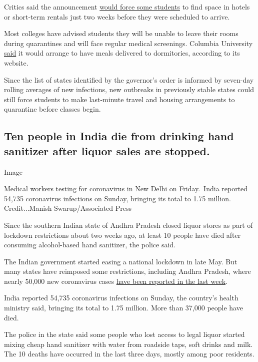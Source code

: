 Critics said the announcement
\href{https://cornellsun.com/2020/07/31/editorial-cornells-inability-to-quarantine-arriving-students-should-concern-you/}{would
force some students} to find space in hotels or short-term rentals just
two weeks before they were scheduled to arrive.

Most colleges have advised students they will be unable to leave their
rooms during quarantines and will face regular medical screenings.
Columbia University
\href{https://roomselection.housing.columbia.edu/}{said} it would
arrange to have meals delivered to dormitories, according to its
website.

Since the list of states identified by the governor's order is informed
by seven-day rolling averages of new infections, new outbreaks in
previously stable states could still force students to make last-minute
travel and housing arrangements to quarantine before classes begin.

\hypertarget{ten-people-in-india-die-from-drinking-hand-sanitizer-after-liquor-sales-are-stopped}{%
\subsection{Ten people in India die from drinking hand sanitizer after
liquor sales are
stopped.}\label{ten-people-in-india-die-from-drinking-hand-sanitizer-after-liquor-sales-are-stopped}}

Image

Medical workers testing for coronavirus in New Delhi on Friday.~India
reported 54,735 coronavirus infections on Sunday, bringing its total to
1.75 million. Credit...Manish Swarup/Associated Press

Since the southern Indian state of Andhra Pradesh closed liquor stores
as part of lockdown restrictions about two weeks ago, at least 10 people
have died after consuming alcohol-based hand sanitizer, the police said.

The Indian government started easing a national lockdown in late May.
But many states have reimposed some restrictions, including Andhra
Pradesh, where nearly 50,000 new coronavirus cases
\href{https://www.nytimes3xbfgragh.onion/interactive/2020/world/asia/india-coronavirus-cases.html\#cases}{have
been reported in the last week}.

India reported 54,735 coronavirus infections on Sunday, the country's
health ministry said, bringing its total to 1.75 million. More than
37,000 people have died.

The police in the state said some people who lost access to legal liquor
started mixing cheap hand sanitizer with water from roadside taps, soft
drinks and milk. The 10 deaths have occurred in the last three days,
mostly among poor residents.

